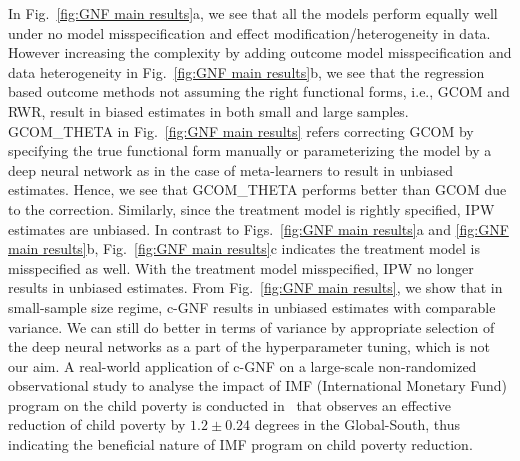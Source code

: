 \documentclass[letterpaper]{article} %
\begin{document}
In Fig.~\ref{fig:GNF main results}a, we see that all the models perform equally well under no model misspecification and effect modification/heterogeneity in data.
However increasing the complexity by adding outcome model misspecification and data heterogeneity in Fig.~\ref{fig:GNF main results}b, we see that the regression based outcome methods not assuming the right functional forms, i.e., GCOM and RWR, result in biased estimates in both small and large samples. 
{GCOM\_THETA} in Fig.~\ref{fig:GNF main results} refers correcting GCOM by specifying the true functional form manually or parameterizing the model by a deep neural network as in the case of meta-learners to result in unbiased estimates.
Hence, we see that {GCOM\_THETA} performs better than {GCOM} due to the correction.
Similarly, since the treatment model is rightly specified, IPW estimates are unbiased. 
In contrast to Figs.~\ref{fig:GNF main results}a and \ref{fig:GNF main results}b, Fig.~\ref{fig:GNF main results}c indicates the treatment model is misspecified as well. With the treatment model misspecified, IPW no longer results in unbiased estimates.
From Fig.~\ref{fig:GNF main results}, we show that in small-sample size regime, c-GNF results in unbiased estimates with comparable variance.
We can still do better in terms of variance by appropriate selection of the deep neural networks as a part of the hyperparameter tuning, which is not our aim.
A real-world application of c-GNF on a large-scale non-randomized observational study to analyse the impact of IMF (International Monetary Fund) program on the child poverty is conducted in~\citet{balgi2022counterfactual} that observes an effective reduction of child poverty by $1.2{\pm}0.24$ degrees in the Global-South, thus indicating the beneficial nature of IMF program on child poverty reduction.
\end{document}

